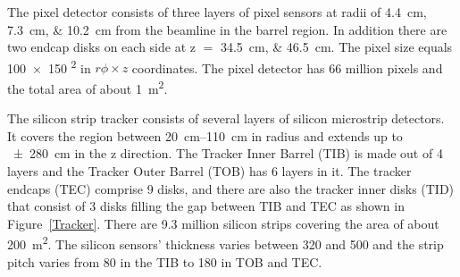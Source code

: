 The pixel detector consists of three layers of pixel sensors at radii of \SIlist{4.4;7.3;10.2}{\cm} from the beamline in
the barrel region. In addition there are two endcap disks on each side at \abs z $=$ \SIlist{34.5;46.5}{\cm}. The pixel
size equals \num{100x150} \si{\micron\squared} in $r \phi \times z$ coordinates. The pixel detector has 66 million
pixels and the total area of about \SI{1}{\m\squared}.

The silicon strip tracker consists of several layers of silicon microstrip detectors. It covers the region between
\SIrange{20}{110}{\cm} in radius and extends up to \SI{+-280}{\cm} in the z direction. The Tracker Inner Barrel (TIB) is
made out of 4 layers and the Tracker Outer Barrel (TOB) has 6 layers in it. The tracker endcaps (TEC) comprise 9 disks,
and there are also the tracker inner disks (TID) that consist of 3 disks filling the gap between TIB and TEC as shown in
Figure~\ref{Tracker}. There are \num{9.3} million silicon strips covering the area of about \SI{200}{\m\squared}. The
silicon sensors' thickness varies between \num{320} and \SI{500}{\micron} and the strip pitch varies from
\SI{80}{\micron} in the TIB to \SI{180}{\micron} in TOB and TEC.

